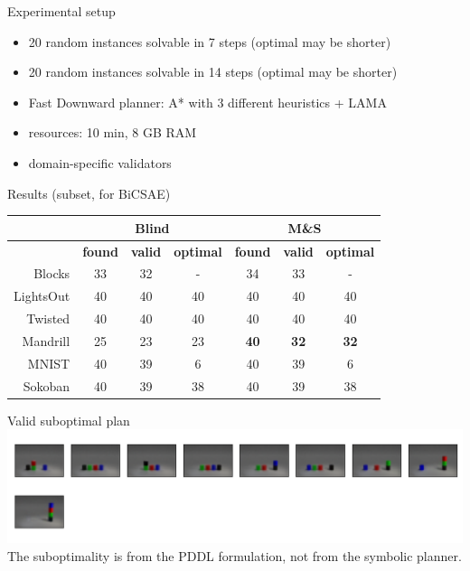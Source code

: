 \documentclass{lecture}
\begin{document}
\begin{frame}{Experimental setup}
    \begin{itemize}    
        \item 20 random instances solvable in 7 steps (optimal may be shorter)
        \item 20 random instances solvable in 14 steps (optimal may be shorter)
        \item Fast Downward planner: A* with 3 different heuristics + LAMA
        \item resources: 10 min, 8 GB RAM
        \item domain-specific validators
    \end{itemize}
\end{frame}

\begin{frame}{Results (subset, for BiCSAE)}
    \centering
    \begin{tabular}{|r|ccc|ccc|}
        \hline
         & \multicolumn{ 3}{c|}{Blind} & \multicolumn{ 3}{c|}{M\&S} \\
         \hline
 & \textbf{found} & \textbf{valid} & {\textbf{optimal}} & {\textbf{found}} & {\textbf{valid}} & {\textbf{optimal}} \\
        \hline
        Blocks & {33} & {32} & - & {34} & {33} & - \\
        LightsOut & 40 & 40 & {40} & 40 & 40 & {40} \\
        Twisted & 40 & 40 & {40} & 40 & 40 & {40} \\
        Mandrill & 25 & 23 & {23} & \textbf{40} & \textbf{32} & \textbf{32} \\
        MNIST & {40} & 39 & {6} & {40} & 39 & {6} \\        
        Sokoban & {40} & {39} & {38} & {40} & {39} & {38} \\
        \hline
        \end{tabular}
\end{frame}

\begin{frame}{Valid suboptimal plan}
    \includegraphics[width=\textwidth]{img___static___examples___014-020-ama3_samples_blocks_cylinders-4-flat_20000_None_None_CubeSpaceAE_AMA4Conv_nozsae2_logs_05-16T00-57-30-000_domain_lmcut_problem_False-1.png}
    \vfill
    The suboptimality is from the PDDL formulation, not from the symbolic planner.
    \vfill
\end{frame}
\end{document}
